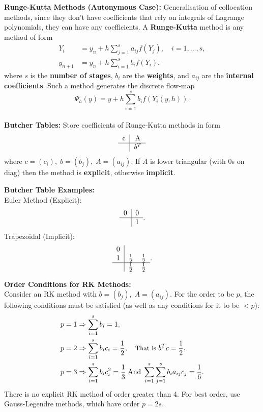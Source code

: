 \documentclass[10pt,a4paper]{article}
\renewcommand{\implies}{\Rightarrow}
\begin{document}
\begin{multicols*}{2}
\textbf{Runge-Kutta Methods (Autonymous Case):} Generalisation of collocation methods, since they don't have coefficients that rely on integrals of Lagrange polynomials, they can have any coefficients. A \textbf{Runge-Kutta} method is any method of form 
\begin{align*}
    Y_i &= y_n + h \sum_{j = 1}^s a_{ij}f(Y_j), \quad i = 1,...,s,\\
    y_{n+1} &= y_n + h\sum_{i = 1}^s b_i f(Y_i).
\end{align*}
where $s$ is the \textbf{number of stages}, $b_i$ are the \textbf{weights}, and $a_{ij}$ are the \textbf{internal coefficients}. Such a method generates the discrete flow-map
\[
\Psi_h(y) = y + h \sum_{i = 1}^s b_i f(Y_i(y, h)).
\]\\
\textbf{Butcher Tables:} Store coefficients of Runge-Kutta methods in form 
\[
\begin{tabular}{ c | c }
    c & A \\ 
    \hline
     & $b^T$ \\  
   \end{tabular}
\] where $c = (c_i), \; b = (b_j), \; A = (a_{ij})$. If $A$ is lower triangular (with $0$s on diag) then the method is \textbf{explicit}, otherwise \textbf{implicit}.

\textbf{Butcher Table Examples:} \\
Euler Method (Explicit):
\[
\begin{tabular}{ c | c }
    0 & 0 \\ 
    \hline
     & 1 \\  
   \end{tabular}.
\] Trapezoidal (Implicit):
\[
\begin{tabular}{ c | c c }
    0 & \\ 
    1 & $\frac{1}{2}$ & $\frac{1}{2}$ \\
    \hline
     & $\frac{1}{2}$ & $\frac{1}{2}$ \\  
   \end{tabular}.
\]

\textbf{Order Conditions for RK Methods:}\\
Consider an RK method with $b = (b_j), \; A = (a_{ij})$. For the order to be $p$, the following conditions must be satisfied (as well as any conditions for it to be $<p$):
\begin{align*}
    p = 1 &\implies \sum_{i=1}^s b_i = 1, \\
    p = 2 &\implies \sum_{i=1}^s b_ic_i = \frac{1}{2}, \quad \small\text{That is } b^Tc = \frac{1}{2}\normalsize,\\
    p = 3 &\implies \sum_{i=1}^s b_ic_i^2 = \frac{1}{3} \;\text{And}\; \sum_{i=1}^s\sum_{j=1}^s b_ia_{ij}c_j = \frac{1}{6}.
\end{align*}
There is no explicit RK method of order greater than 4. For best order, use Gauss-Legendre methods, which have order $p = 2s$.\\

\end{multicols*}
\end{document}
